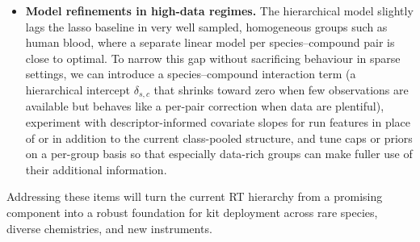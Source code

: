 \documentclass[11pt]{article}
\begin{document}
\begin{itemize}
  \item \textbf{Model refinements in high-data regimes.} The hierarchical model
  slightly lags the lasso baseline in very well sampled, homogeneous groups such as
  human blood, where a separate linear model per species--compound pair is close to
  optimal. To narrow this gap without sacrificing behaviour in sparse settings, we
  can introduce a species--compound interaction term (a hierarchical intercept
  $\delta_{s,c}$ that shrinks toward zero when few observations are available but
  behaves like a per-pair correction when data are plentiful), experiment with
  descriptor-informed covariate slopes for run features in place of or in addition to
  the current class-pooled structure, and tune caps or priors on a per-group basis so
  that especially data-rich groups can make fuller use of their additional
  information.
\end{itemize}

Addressing these items will turn the current RT hierarchy from a promising component
into a robust foundation for kit deployment across rare species, diverse chemistries,
and new instruments.
\end{document}
